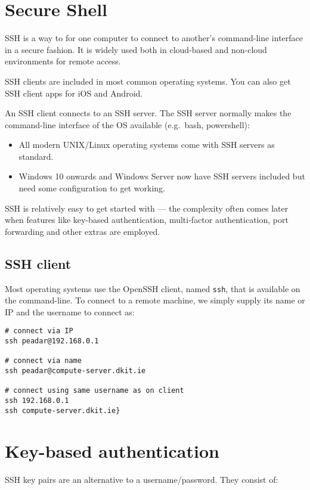 \section{Secure Shell}

SSH is a way to for one computer to connect to another's command-line
interface in a secure fashion. It is widely used both in cloud-based and
non-cloud environments for remote access.

SSH clients are included in most common operating systems. You can also
get SSH client apps for iOS and Android.

An SSH client connects to an SSH server.
The SSH server normally makes the command-line interface of the OS available (e.g.~bash, powershell):
\begin{itemize}
\item All modern UNIX/Linux operating systems come with SSH servers as standard.
\item Windows 10 onwards and Windows Server now have SSH servers included but need some configuration to get working.
\end{itemize}
  
SSH is relatively easy to get started with --- the complexity often comes
later when features like key-based authentication, multi-factor
authentication, port forwarding and other extras are employed.

\subsection{SSH client}
\label{ssh-client}

Most operating systems use the OpenSSH client, named \texttt{ssh}, that is available on the command-line.
To connect to a remote machine, we simply supply its name or IP and the username to connect as:

\begin{verbatim}
# connect via IP
ssh peadar@192.168.0.1

# connect via name
ssh peadar@compute-server.dkit.ie

# connect using same username as on client
ssh 192.168.0.1
ssh compute-server.dkit.ie}
\end{verbatim}

\section{Key-based authentication}
\label{key-based-authentication}

SSH key pairs are an alternative to a username/password. They consist
of:

